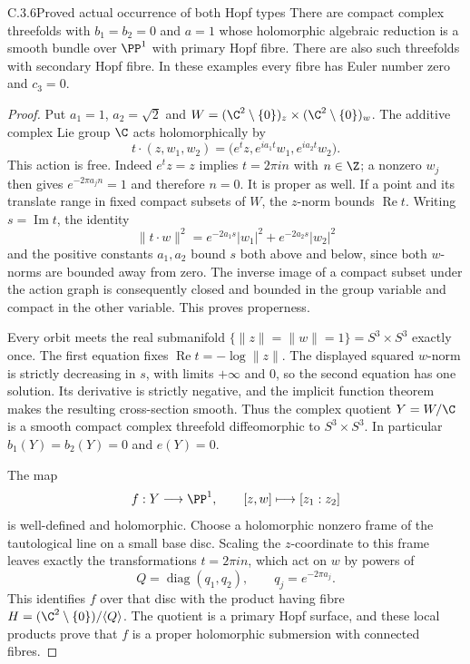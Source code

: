 \begin{idstatement}{C.3.6}{Proved actual occurrence of both Hopf types}
\label{st:C.3.6}
There are compact complex threefolds with $b_1=b_2=0$ and $a=1$
whose holomorphic algebraic reduction is a smooth bundle over
$\PP^1$ with primary Hopf fibre. There are also such threefolds
with secondary Hopf fibre. In these examples every fibre has Euler
number zero and $c_3=0$.
\end{idstatement}
\begin{proof}
Put $a_1=1$, $a_2=\sqrt2$ and
$W=(\C^2\setminus\{0\})_z\times(\C^2\setminus\{0\})_w$.
The additive complex Lie group $\C$ acts holomorphically by
\[
t\cdot(z,w_1,w_2)
 =\bigl(e^t z,e^{ia_1t}w_1,e^{ia_2t}w_2\bigr).
\tag{C.H.1}
\]
This action is free. Indeed $e^t z=z$ implies $t=2\pi in$ with
$n\in\Z$; a nonzero $w_j$ then gives $e^{-2\pi a_jn}=1$ and
therefore $n=0$. It is proper as well. If a point and its translate
range in fixed compact subsets of $W$, the $z$-norm bounds
$\operatorname{Re}t$. Writing $s=\operatorname{Im}t$, the identity
\[
\|t\cdot w\|^2
 =e^{-2a_1s}|w_1|^2+e^{-2a_2s}|w_2|^2
\]
and the positive constants $a_1,a_2$ bound $s$ both above and
below, since both $w$-norms are bounded away from zero. The inverse
image of a compact subset under the action graph is consequently
closed and bounded in the group variable and compact in the other
variable. This proves properness.

Every orbit meets the real submanifold
$\{\|z\|=\|w\|=1\}=S^3\times S^3$ exactly once.
The first equation fixes $\operatorname{Re}t=-\log\|z\|$.
The displayed squared $w$-norm is strictly decreasing in $s$,
with limits $+\infty$ and $0$, so the second equation has one
solution. Its derivative is strictly negative, and the implicit
function theorem makes the resulting cross-section smooth.
Thus the complex quotient $Y=W/\C$ is a smooth compact complex
threefold diffeomorphic to $S^3\times S^3$. In particular
$b_1(Y)=b_2(Y)=0$ and $e(Y)=0$.

The map
\[
f:Y\longrightarrow\PP^1,\qquad [z,w]\longmapsto[z_1:z_2]
\]
is well-defined and holomorphic. Choose a holomorphic nonzero
frame of the tautological line on a small base disc. Scaling the
$z$-coordinate to this frame leaves exactly the transformations
$t=2\pi in$, which act on $w$ by powers of
\[
Q=\operatorname{diag}(q_1,q_2),\qquad
q_j=e^{-2\pi a_j}.
\]
This identifies $f$ over that disc with the product having fibre
$H=(\C^2\setminus\{0\})/\langle Q\rangle$.
The quotient is a primary Hopf surface, and these local products
prove that $f$ is a proper holomorphic submersion with connected
fibres.


\end{proof}

